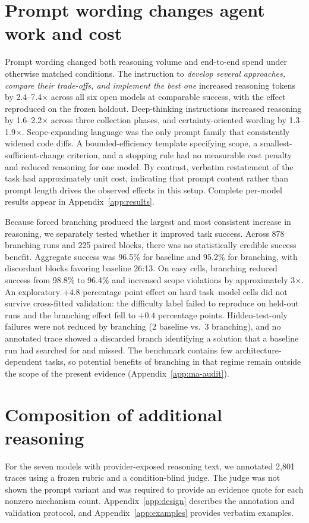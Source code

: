 \documentclass[11pt]{article}
\newcommand{\xd}{$\times$}
\begin{document}
\section{Prompt wording changes agent work and cost}
\label{sec:primary}
Prompt wording changed both reasoning volume and end-to-end spend under
otherwise matched conditions. The instruction to \emph{develop several
approaches, compare their trade-offs, and implement the best one} increased
reasoning tokens by 2.4--7.4\xd{} across all six open models at comparable
success, with the effect reproduced on the frozen holdout. Deep-thinking
instructions increased reasoning by 1.6--2.2\xd{} across three collection
phases, and certainty-oriented wording by 1.3--1.9\xd{}. Scope-expanding
language was the only prompt family that consistently widened code diffs.
A bounded-efficiency template specifying scope, a smallest-sufficient-change
criterion, and a stopping rule had no measurable cost penalty and reduced
reasoning for one model. By contrast, verbatim restatement of the task had
approximately unit cost, indicating that prompt content rather than prompt
length drives the observed effects in this setup. Complete per-model results
appear in Appendix~\ref{app:results}.

Because forced branching produced the largest and most consistent increase
in reasoning, we separately tested whether it improved task success. Across
878 branching runs and 225 paired blocks, there was no statistically
credible success benefit. Aggregate success was 96.5\% for baseline and
95.2\% for branching, with discordant blocks favoring baseline 26:13. On
easy cells, branching reduced success from 98.8\% to 96.4\% and increased
scope violations by approximately 3\xd{}. An exploratory $+4.8$ percentage
point effect on hard task--model cells did not survive cross-fitted
validation: the difficulty label failed to reproduce on held-out runs and
the branching effect fell to $+0.4$ percentage points. Hidden-test-only
failures were not reduced by branching (2 baseline vs.\ 3 branching), and
no annotated trace showed a discarded branch identifying a solution that a
baseline run had searched for and missed. The benchmark contains few
architecture-dependent tasks, so potential benefits of branching in that
regime remain outside the scope of the present evidence
(Appendix~\ref{app:ma-audit}).

\section{Composition of additional reasoning}
\label{sec:semantic}
For the seven models with provider-exposed reasoning text, we annotated
2{,}801 traces using a frozen rubric and a condition-blind judge. The judge
was not shown the prompt variant and was required to provide an evidence
quote for each nonzero mechanism count. Appendix~\ref{app:design} describes
the annotation and validation protocol, and Appendix~\ref{app:examples}
provides verbatim examples.
\end{document}
